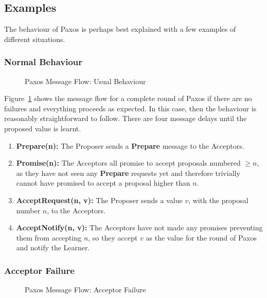 \documentclass[12pt,twoside,notitlepage]{report}
\newcommand{\lwincludegraphics}[2][]{%
  \sbox{0}{\texttt{[image: \#2]}}%
  \ifdim\wd0>\linewidth
    \resizebox{\linewidth}{!}{\box0 }%
  \else
    \leavevmode\box0
  \fi}
\newcommand{\msg}[1] {{\bf #1}}         %
\begin{document}
\subsection*{Examples}

The behaviour of Paxos is perhaps best explained with a few examples of different situations.

\subsubsection*{Normal Behaviour}

\begin{figure}[h!]
\centering
\lwincludegraphics{figs/paxos-msg-flow-usual.eps}
\caption{\label{fig:paxos-usual}Paxos Message Flow: Usual Behaviour}
\end{figure}

Figure~\ref{fig:paxos-usual} shows the message flow for a
complete round of Paxos if there are no failures and everything proceeds as expected. In this
case, then the behaviour is reasonably straightforward to follow. There are four message delays
until the proposed value is learnt.

\begin{enumerate}
\item \msg{Prepare(n):} The Proposer sends a \msg{Prepare} message to the Acceptors.
\item \msg{Promise(n):} The Acceptors all promise to accept proposals numbered $\ge n$, as they
	have not seen any \msg{Prepare} requests yet and therefore trivially cannot have promised
	to accept a proposal higher than $n$.
\item \msg{AcceptRequest(n, v):} The Proposer sends a value $v$, with the proposal number $n$, to
	the Acceptors.
\item \msg{AcceptNotify(n, v):} The Acceptors have not made any promises preventing them from
	accepting $n$, so they accept $v$ as the value for the round of Paxos and notify the
	Learner.
\end{enumerate}

\subsubsection*{Acceptor Failure}

\begin{figure}[h!]
\centering
\lwincludegraphics{figs/paxos-msg-flow-one-acceptor-fail.eps}
\caption{\label{fig:paxos-acceptor-fail}Paxos Message Flow: Acceptor Failure}
\end{figure}
\end{document}
